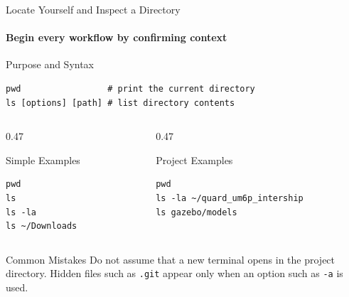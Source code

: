 \begin{frame}[fragile]{Locate Yourself and Inspect a Directory}
\framesubtitle{Begin every workflow by confirming context}

\footnotesize

\begin{block}{Purpose and Syntax}
\begin{verbatim}
pwd                 # print the current directory
ls [options] [path] # list directory contents
\end{verbatim}
\end{block}

\begin{columns}[T,onlytextwidth]
    \begin{column}{0.47\textwidth}
        \begin{exampleblock}{Simple Examples}
\begin{verbatim}
pwd
ls
ls -la
ls ~/Downloads
\end{verbatim}
        \end{exampleblock}
    \end{column}

    \begin{column}{0.47\textwidth}
        \begin{exampleblock}{Project Examples}
\begin{verbatim}
pwd
ls -la ~/quard_um6p_intership
ls gazebo/models
\end{verbatim}
        \end{exampleblock}
    \end{column}
\end{columns}

\begin{alertblock}{Common Mistakes}
Do not assume that a new terminal opens in the project directory. Hidden files
such as \texttt{.git} appear only when an option such as \texttt{-a} is used.
\end{alertblock}
\end{frame}

